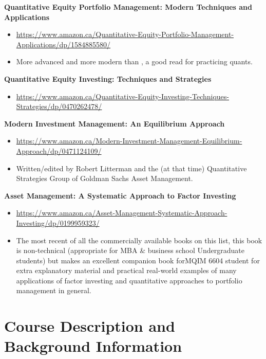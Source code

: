 \documentclass[]{book}
\providecommand{\tightlist}{%
  \setlength{\itemsep}{0pt}\setlength{\parskip}{0pt}}
\theoremstyle{definition}
\theoremstyle{definition}
\theoremstyle{definition}
\theoremstyle{remark}
\begin{document}
\textbf{Quantitative Equity Portfolio Management: Modern Techniques and
Applications} \citep{qian2007}

\begin{itemize}
\tightlist
\item
  \url{https://www.amazon.ca/Quantitative-Equity-Portfolio-Management-Applications/dp/1584885580/}
\item
  More advanced and more modern than \citep{grinold2000}, a good read
  for practicing quants.
\end{itemize}

\textbf{Quantitative Equity Investing: Techniques and Strategies}
\citep{fabozzi2010}

\begin{itemize}
\tightlist
\item
  \url{https://www.amazon.ca/Quantitative-Equity-Investing-Techniques-Strategies/dp/0470262478/}
\end{itemize}

\textbf{Modern Investment Management: An Equilibrium Approach}
\citep{litterman2003}

\begin{itemize}
\tightlist
\item
  \url{https://www.amazon.ca/Modern-Investment-Management-Equilibrium-Approach/dp/0471124109/}
\item
  Written/edited by Robert Litterman and the (at that time) Quantitative
  Strategies Group of Goldman Sachs Asset Management.
\end{itemize}

\textbf{Asset Management: A Systematic Approach to Factor Investing}
\citep{ang2014}

\begin{itemize}
\tightlist
\item
  \url{https://www.amazon.ca/Asset-Management-Systematic-Approach-Investing/dp/0199959323/}
\item
  The most recent of all the commercially available books on this list,
  this book is non-technical (appropriate for MBA \& business school
  Undergraduate students) but makes an excellent companion book forMQIM
  6604 student for extra explanatory material and practical real-world
  examples of many applications of factor investing and quantitative
  approaches to portfolio management in general.
\end{itemize}

\section{Course Description and Background
Information}\label{course-description-and-background-information}
\end{document}
